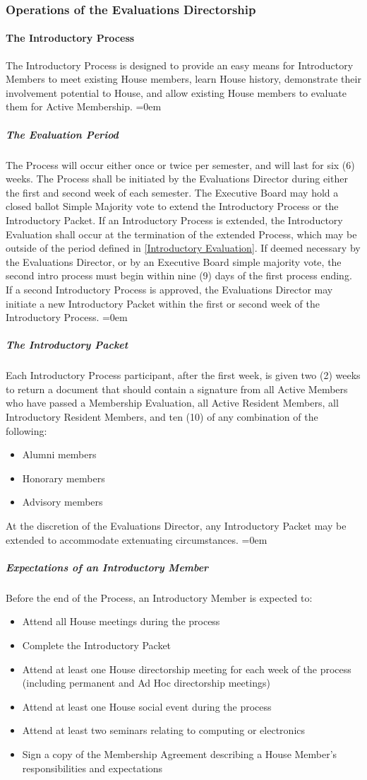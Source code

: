 \documentclass{article}
\newcommand{\asubsection}[1]{\subsubsection{#1} \label{#1}}
\newcommand{\asubsubsection}[1]{\paragraph{#1} \label{#1}}
\newcommand{\asubsubsubsection}[1]{\parindent=0em\subparagraph{#1} \label{#1}}
\begin{document}
\asubsection{Operations of the Evaluations Directorship}
\asubsubsection{The Introductory Process}
The Introductory Process is designed to provide an easy means for Introductory Members to meet existing House members, learn House history, demonstrate their involvement potential to House, and allow existing House members to evaluate them for Active Membership.
\asubsubsubsection{The Evaluation Period}
The Process will occur either once or twice per semester, and will last for six (6) weeks.
The Process shall be initiated by the Evaluations Director during either the first and second week of each semester.
The Executive Board may hold a closed ballot Simple Majority vote to extend the Introductory Process or the Introductory Packet.
If an Introductory Process is extended, the Introductory Evaluation shall occur at the termination of the extended Process, which may be outside of the period defined in \ref{Introductory Evaluation}.
If deemed necessary by the Evaluations Director, or by an Executive Board simple majority vote, the second intro process must begin within nine (9) days of the first process ending.
If a second Introductory Process is approved, the Evaluations Director may initiate a new Introductory Packet within the first or second week of the Introductory Process.
\asubsubsubsection{The Introductory Packet}
Each Introductory Process participant, after the first week, is given two (2) weeks to return a document that should contain a signature from all Active Members who have passed a Membership Evaluation, all Active Resident Members, all Introductory Resident Members, and ten (10) of any combination of the following:
\begin{itemize}
	\item Alumni members
	\item Honorary members
	\item Advisory members
\end{itemize}
At the discretion of the Evaluations Director, any Introductory Packet may be extended to accommodate extenuating circumstances.
\asubsubsubsection{Expectations of an Introductory Member}
Before the end of the Process, an Introductory Member is expected to:
\begin{itemize}
\item Attend all House meetings during the process
\item Complete the Introductory Packet
\item Attend at least one House directorship meeting for each week of the process (including permanent and Ad Hoc directorship meetings)
\item Attend at least one House social event during the process
\item Attend at least two seminars relating to computing or electronics
\item Sign a copy of the Membership Agreement describing a House Member’s responsibilities and expectations
\end{itemize}
\end{document}
